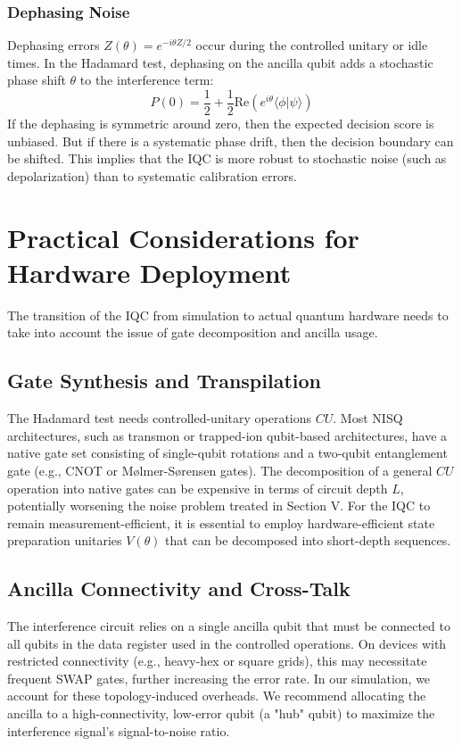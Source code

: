 \documentclass[conference]{IEEEtran}
\begin{document}
\subsubsection{Dephasing Noise}
Dephasing errors $Z(\theta) = e^{-i\theta Z/2}$ occur during the controlled unitary or idle times. In the Hadamard test, dephasing on the ancilla qubit adds a stochastic phase shift $\theta$ to the interference term:
\begin{equation}
    P(0) = \frac{1}{2} + \frac{1}{2} \text{Re}(e^{i\theta} \langle \phi | \psi \rangle)
\end{equation}
If the dephasing is symmetric around zero, then the expected decision score is unbiased. But if there is a systematic phase drift, then the decision boundary can be shifted. This implies that the IQC is more robust to stochastic noise (such as depolarization) than to systematic calibration errors.

\section{Practical Considerations for Hardware Deployment}

The transition of the IQC from simulation to actual quantum hardware needs to take into account the issue of gate decomposition and ancilla usage.

\subsection{Gate Synthesis and Transpilation}

The Hadamard test needs controlled-unitary operations $CU$. Most NISQ architectures, such as transmon or trapped-ion qubit-based architectures, have a native gate set consisting of single-qubit rotations and a two-qubit entanglement gate (e.g., CNOT or Mølmer-Sørensen gates). The decomposition of a general $CU$ operation into native gates can be expensive in terms of circuit depth $L$, potentially worsening the noise problem treated in Section V. For the IQC to remain measurement-efficient, it is essential to employ hardware-efficient state preparation unitaries $V(\theta)$ that can be decomposed into short-depth sequences.

\subsection{Ancilla Connectivity and Cross-Talk}

The interference circuit relies on a single ancilla qubit that must be connected to all qubits in the data register used in the controlled operations. On devices with restricted connectivity (e.g., heavy-hex or square grids), this may necessitate frequent SWAP gates, further increasing the error rate. In our simulation, we account for these topology-induced overheads. We recommend allocating the ancilla to a high-connectivity, low-error qubit (a "hub" qubit) to maximize the interference signal's signal-to-noise ratio.
\end{document}
